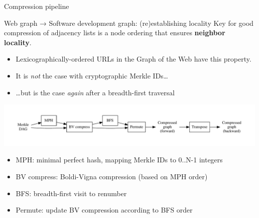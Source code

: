 \documentclass[aspectratio=169,xcolor=table]{beamer}
\begin{document}
\begin{frame}{Compression pipeline}
        \begin{block}{Web graph → Software development graph: (re)establishing locality}
            Key for good compression of adjacency lists is a \alert{node
            ordering} that ensures \textbf{neighbor locality}.
            \begin{itemize}
                \item Lexicographically-ordered URLs in the Graph of the Web
                    have this property.
                \item It is \emph{not} the case with cryptographic Merkle
                    IDs\ldots{}
                \item \ldots but is the case \emph{again} after a
                    breadth-first traversal
            \end{itemize}
        \end{block}
        \vspace{-0.7cm}
        \begin{center}
            \includegraphics[width=1\linewidth]{../img/compression/compression_steps-nofiles}
        \end{center}
        \vspace{-1cm}
        \begin{itemize}
            \item \alert{MPH:} minimal perfect hash, mapping Merkle IDs to 0..N-1 integers
            \item \alert{BV compress:} Boldi-Vigna compression (based on MPH order)
            \item \alert{BFS:} breadth-first visit to renumber
            \item \alert{Permute:} update BV compression according to BFS order
        \end{itemize}
    \end{frame}
\end{document}
